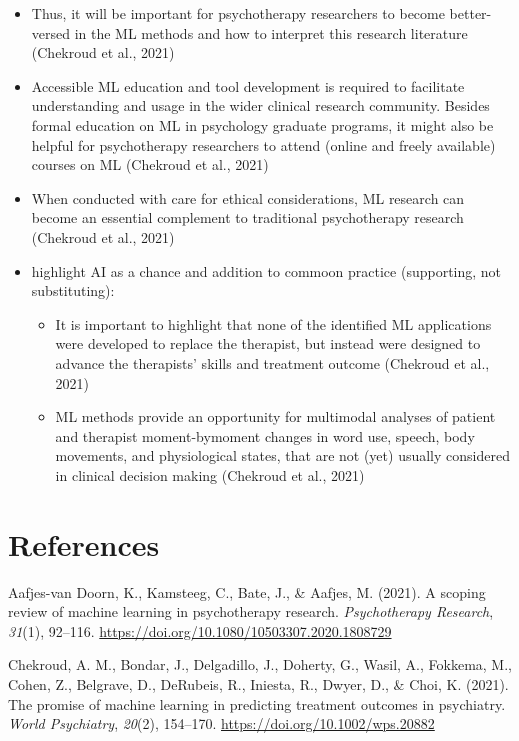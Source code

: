 \documentclass[
  man]{apa7}
\providecommand{\tightlist}{%
  \setlength{\itemsep}{0pt}\setlength{\parskip}{0pt}}
\newlength{\cslhangindent}
\newlength{\cslentryspacingunit} %
\newenvironment{CSLReferences}[2] %
 {%
  \setlength{\parindent}{0pt}
  \ifodd #1
  \let\oldpar\par
  \def\par{\hangindent=\cslhangindent\oldpar}
  \fi
  \setlength{\parskip}{#2\cslentryspacingunit}
 }%
 {}
\begin{document}
\begin{itemize}
\tightlist
\item
  Thus, it will be important for psychotherapy researchers to become better-versed in the ML methods and how to interpret this research literature (Chekroud et al., 2021)
\item
  Accessible ML education and tool development is required to facilitate understanding and usage in the wider clinical research community. Besides formal education on ML in psychology graduate programs, it might also be helpful for psychotherapy researchers to attend (online and freely available) courses on ML (Chekroud et al., 2021)
\item
  When conducted with care for ethical considerations, ML research can become an essential complement to traditional psychotherapy research (Chekroud et al., 2021)
\item
  highlight AI as a chance and addition to commoon practice (supporting, not substituting):

  \begin{itemize}
  \tightlist
  \item
    It is important to highlight that none of the identified ML applications were developed to replace the therapist, but instead were designed to advance the therapists' skills and treatment outcome (Chekroud et al., 2021)
  \item
    ML methods provide an opportunity for multimodal analyses of patient and therapist moment-bymoment changes in word use, speech, body movements, and physiological states, that are not (yet) usually considered in clinical decision making (Chekroud et al., 2021)
  \end{itemize}
\end{itemize}

\newpage

\hypertarget{references}{%
\section{References}\label{references}}

\hypertarget{refs}{}
\begin{CSLReferences}{1}{0}
\leavevmode{}%
Aafjes-van Doorn, K., Kamsteeg, C., Bate, J., \& Aafjes, M. (2021). A scoping review of machine learning in psychotherapy research. \emph{Psychotherapy Research}, \emph{31}(1), 92--116. \url{https://doi.org/10.1080/10503307.2020.1808729}

\leavevmode{}%
Chekroud, A. M., Bondar, J., Delgadillo, J., Doherty, G., Wasil, A., Fokkema, M., Cohen, Z., Belgrave, D., DeRubeis, R., Iniesta, R., Dwyer, D., \& Choi, K. (2021). The promise of machine learning in predicting treatment outcomes in psychiatry. \emph{World Psychiatry}, \emph{20}(2), 154--170. \url{https://doi.org/10.1002/wps.20882}

\end{CSLReferences}
\end{document}
